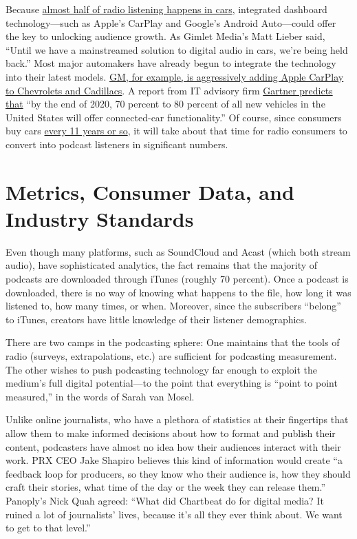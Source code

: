 \documentclass[notoc, symmetric, nobib, nols]{towcenter-guideto-book}
\begin{document}
Because \href{http://qz.com/195349/the-remarkable-resilience-of-old-fashioned-radio-in-the-us/}{almost half of radio listening happens in cars}, integrated dashboard technology---such as Apple's CarPlay and Google's Android Auto---could offer the key to unlocking audience growth.\autocite{radiocars} As Gimlet Media's Matt Lieber said, ``Until we have a mainstreamed solution to digital audio in cars, we're being held back.''\autocite{lieber} Most major automakers have already begun to integrate the technology into their latest models. \href{http://gizmodo.com/chevy-is-bringing-apple-carplay-and-android-auto-to-the-1707219276}{GM, for example, is aggressively adding Apple CarPlay to Chevrolets and Cadillacs}.\autocite{gm} A report from IT advisory firm \href{http://www.forbes.com/sites/samsungbusiness/2015/09/23/how-your-car-is-becoming-the-next-hot-tech-gadget/}{Gartner predicts that} ``by the end of 2020, 70 percent to 80 percent of all new vehicles in the United States will offer connected-car functionality.''\autocite{gartner} Of course, since consumers buy cars \href{http://www.forbes.com/sites/jimhenry/2012/01/20/average-car-in-the-u-s-now-over-10-years-old-a-record/}{every 11 years or so}, it will take about that time for radio consumers to convert into podcast listeners in significant numbers.\autocite{carbuying} 

\section{Metrics, Consumer Data, and Industry Standards}

Even though many platforms, such as SoundCloud and Acast (which both stream audio), have sophisticated analytics, the fact remains that the majority of podcasts are downloaded through iTunes (roughly 70 percent).\autocite{digiday} Once a podcast is downloaded, there is no way of knowing what happens to the file, how long it was listened to, how many times, or when. Moreover, since the subscribers ``belong'' to iTunes, creators have little knowledge of their listener demographics.

There are two camps in the podcasting sphere: One maintains that the tools of radio (surveys, extrapolations, etc.) are sufficient for podcasting measurement. The other wishes to push podcasting technology far enough to exploit the medium's full digital potential---to the point that everything is ``point to point measured,'' in the words of Sarah van Mosel.\autocite{mosel} 

Unlike online journalists, who have a plethora of statistics at their fingertips that allow them to make informed decisions about how to format and publish their content, podcasters have almost no idea how their audiences interact with their work. PRX CEO Jake Shapiro believes this kind of information would create ``a feedback loop for producers, so they know who their audience is, how they should craft their stories, what time of the day or the week they can release them.''\autocite{shapiro} Panoply's Nick Quah agreed: ``What did Chartbeat do for digital media? It ruined a lot of journalists' lives, because it's all they ever think about. We want to get to that level.''\autocites{quah, petre} 
\end{document}
